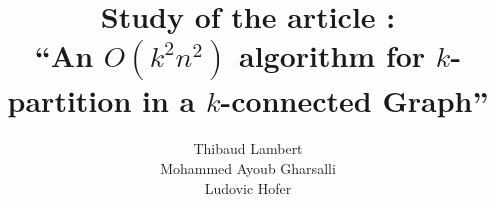 \documentclass[xcolor=dvipsnames]{beamer}
\title[$O(k^2n^2)$ algorithm for $k$-partitioning]{Study of the article :\\``An $O(k^2n^2)$ algorithm for $k$-partition in a $k$-connected Graph''}
\author[Lambert, Gharsalli, Hofer]
       {Thibaud Lambert\\Mohammed Ayoub Gharsalli\\Ludovic Hofer}
\institute{Université de Bordeaux}
\begin{document}
\begin{frame}[plain]
  \maketitle
\end{frame}









%  
%  
\end{document}
